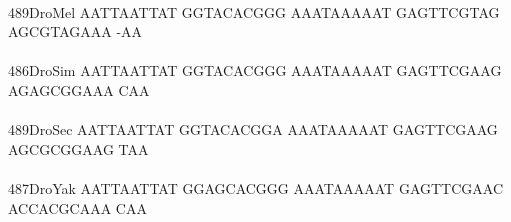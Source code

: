 \documentclass[11pt,twoside,reqno,a4paper]{article}
\begin{document}
{\\
489\hspace*{1\charwidth}DroMel	AATTAATTAT	GGTACACGGG	AAATAAAAAT	GAGTTCGTAG	AGCGTAGAAA	-AA\\
\hspace*{4\charwidth}\hspace*{7\charwidth}\hspace*{1\charwidth}\hspace*{1\charwidth}\hspace*{1\charwidth}\hspace*{1\charwidth}\hspace*{1\charwidth}\\
486\hspace*{1\charwidth}DroSim	AATTAATTAT	GGTACACGGG	AAATAAAAAT	GAGTTCGAAG	AGAGCGGAAA	CAA\\
\hspace*{4\charwidth}\hspace*{7\charwidth}\hspace*{1\charwidth}\hspace*{1\charwidth}\hspace*{1\charwidth}\hspace*{1\charwidth}\hspace*{1\charwidth}\\
489\hspace*{1\charwidth}DroSec	AATTAATTAT	GGTACACGGA	AAATAAAAAT	GAGTTCGAAG	AGCGCGGAAG	TAA\\
\hspace*{4\charwidth}\hspace*{7\charwidth}\hspace*{1\charwidth}\hspace*{1\charwidth}\hspace*{1\charwidth}\hspace*{1\charwidth}\hspace*{1\charwidth}\\
487\hspace*{1\charwidth}DroYak	AATTAATTAT	GGAGCACGGG	AAATAAAAAT	GAGTTCGAAC	ACCACGCAAA	CAA\\
\hspace*{4\charwidth}\hspace*{7\charwidth}\hspace*{1\charwidth}\hspace*{1\charwidth}\hspace*{1\charwidth}\hspace*{1\charwidth}\hspace*{1\charwidth}\\
}
\end{document}
